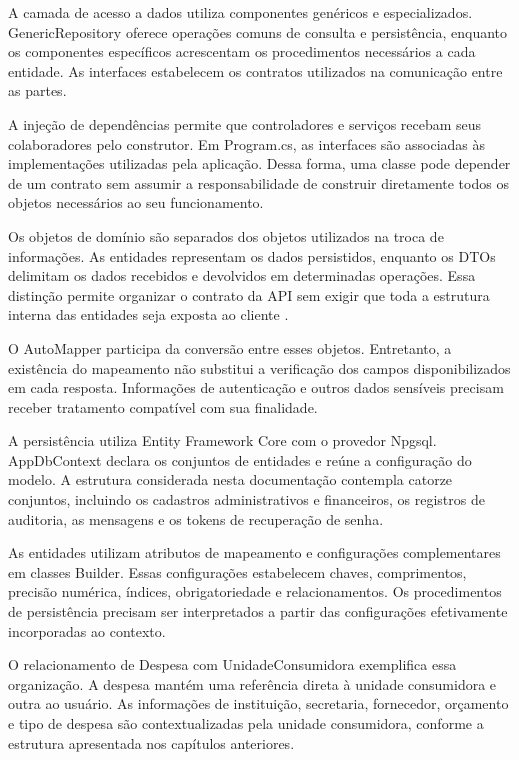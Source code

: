 A camada de acesso a dados utiliza componentes genéricos e especializados. GenericRepository oferece operações comuns de consulta e persistência, enquanto os componentes específicos acrescentam os procedimentos necessários a cada entidade. As interfaces estabelecem os contratos utilizados na comunicação entre as partes.

A injeção de dependências permite que controladores e serviços recebam seus colaboradores pelo construtor. Em Program.cs, as interfaces são associadas às implementações utilizadas pela aplicação. Dessa forma, uma classe pode depender de um contrato sem assumir a responsabilidade de construir diretamente todos os objetos necessários ao seu funcionamento.

Os objetos de domínio são separados dos objetos utilizados na troca de informações. As entidades representam os dados persistidos, enquanto os DTOs delimitam os dados recebidos e devolvidos em determinadas operações. Essa distinção permite organizar o contrato da API sem exigir que toda a estrutura interna das entidades seja exposta ao cliente \parencite{Fowler2002PEAA}.

O AutoMapper participa da conversão entre esses objetos. Entretanto, a existência do mapeamento não substitui a verificação dos campos disponibilizados em cada resposta. Informações de autenticação e outros dados sensíveis precisam receber tratamento compatível com sua finalidade.

A persistência utiliza Entity Framework Core com o provedor Npgsql. AppDbContext declara os conjuntos de entidades e reúne a configuração do modelo. A estrutura considerada nesta documentação contempla catorze conjuntos, incluindo os cadastros administrativos e financeiros, os registros de auditoria, as mensagens e os tokens de recuperação de senha.

As entidades utilizam atributos de mapeamento e configurações complementares em classes Builder. Essas configurações estabelecem chaves, comprimentos, precisão numérica, índices, obrigatoriedade e relacionamentos. Os procedimentos de persistência precisam ser interpretados a partir das configurações efetivamente incorporadas ao contexto.

O relacionamento de Despesa com UnidadeConsumidora exemplifica essa organização. A despesa mantém uma referência direta à unidade consumidora e outra ao usuário. As informações de instituição, secretaria, fornecedor, orçamento e tipo de despesa são contextualizadas pela unidade consumidora, conforme a estrutura apresentada nos capítulos anteriores.

